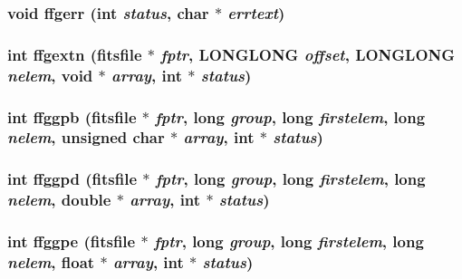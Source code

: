\subsubsection{\setlength{\rightskip}{0pt plus 5cm}void ffgerr (int {\em status}, char $\ast$ {\em errtext})}\label{test_2roimasker_2fitsio_8h_68877812456ad601bf6d5e8f8d9123c2}


\subsubsection{\setlength{\rightskip}{0pt plus 5cm}int ffgextn (\bf{fitsfile} $\ast$ {\em fptr}, \bf{LONGLONG} {\em offset}, \bf{LONGLONG} {\em nelem}, void $\ast$ {\em array}, int $\ast$ {\em status})}\label{test_2roimasker_2fitsio_8h_5fc4e41295a193c81ec7cccd1d682ef2}


\subsubsection{\setlength{\rightskip}{0pt plus 5cm}int ffggpb (\bf{fitsfile} $\ast$ {\em fptr}, long {\em group}, long {\em firstelem}, long {\em nelem}, unsigned char $\ast$ {\em array}, int $\ast$ {\em status})}\label{test_2roimasker_2fitsio_8h_4f44dabf1398b1faa74931df1070d4ef}


\subsubsection{\setlength{\rightskip}{0pt plus 5cm}int ffggpd (\bf{fitsfile} $\ast$ {\em fptr}, long {\em group}, long {\em firstelem}, long {\em nelem}, double $\ast$ {\em array}, int $\ast$ {\em status})}\label{test_2roimasker_2fitsio_8h_e50059a5fe73bbfe285c204a0fcbb81b}


\subsubsection{\setlength{\rightskip}{0pt plus 5cm}int ffggpe (\bf{fitsfile} $\ast$ {\em fptr}, long {\em group}, long {\em firstelem}, long {\em nelem}, float $\ast$ {\em array}, int $\ast$ {\em status})}\label{test_2roimasker_2fitsio_8h_5d09492332cbecfe94b123b8a0defeb9}


